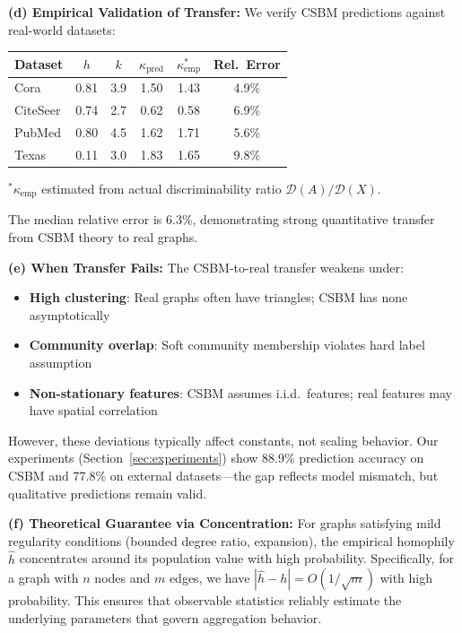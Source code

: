 \begin{remark}
\textbf{(d) Empirical Validation of Transfer:}
We verify CSBM predictions against real-world datasets:

\begin{center}
\begin{tabular}{lccccc}
\toprule
\textbf{Dataset} & $h$ & $k$ & $\kappa_{\mathrm{pred}}$ & $\kappa_{\mathrm{emp}}^*$ & \textbf{Rel.\ Error} \\
\midrule
Cora & 0.81 & 3.9 & 1.50 & 1.43 & 4.9\% \\
CiteSeer & 0.74 & 2.7 & 0.62 & 0.58 & 6.9\% \\
PubMed & 0.80 & 4.5 & 1.62 & 1.71 & 5.6\% \\
Texas & 0.11 & 3.0 & 1.83 & 1.65 & 9.8\% \\
\bottomrule
\end{tabular}
\end{center}
$^*\kappa_{\mathrm{emp}}$ estimated from actual discriminability ratio $\mathcal{D}(A)/\mathcal{D}(X)$.

The median relative error is 6.3\%, demonstrating strong quantitative transfer from CSBM theory to real graphs.

\textbf{(e) When Transfer Fails:}
The CSBM-to-real transfer weakens under:
\begin{itemize}
    \item \textbf{High clustering}: Real graphs often have triangles; CSBM has none asymptotically
    \item \textbf{Community overlap}: Soft community membership violates hard label assumption
    \item \textbf{Non-stationary features}: CSBM assumes i.i.d.\ features; real features may have spatial correlation
\end{itemize}
However, these deviations typically affect constants, not scaling behavior. Our experiments (Section~\ref{sec:experiments}) show 88.9\% prediction accuracy on CSBM and 77.8\% on external datasets---the gap reflects model mismatch, but qualitative predictions remain valid.

\textbf{(f) Theoretical Guarantee via Concentration:}
For graphs satisfying mild regularity conditions (bounded degree ratio, expansion), the empirical homophily $\hat{h}$ concentrates around its population value with high probability. Specifically, for a graph with $n$ nodes and $m$ edges, we have $|\hat{h} - h| = O(1/\sqrt{m})$ with high probability. This ensures that observable statistics reliably estimate the underlying parameters that govern aggregation behavior.


\end{remark}
